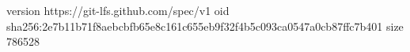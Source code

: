 version https://git-lfs.github.com/spec/v1
oid sha256:2e7b11b71f8aebcbfb65e8c161c655eb9f32f4b5c093ca0547a0cb87ffc7b401
size 786528
